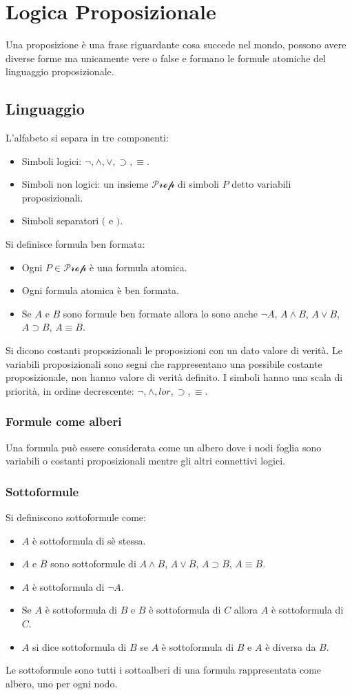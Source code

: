 \chapter{Logica Proposizionale}
Una proposizione \`e una frase riguardante cosa succede nel mondo, possono avere diverse forme ma unicamente vere o false e formano le formule atomiche del
linguaggio proposizionale. 
\section{Linguaggio}
L'alfabeto si separa in tre componenti:
\begin{itemize}
\item Simboli logici: $\neg, \land,\lor, \supset, \equiv$.
\item Simboli non logici: un insieme $\mathcal{Prop}$ di simboli $P$ detto variabili proposizionali.
\item Simboli separatori $($ e $)$.
\end{itemize}
Si definisce formula ben formata:
\begin{itemize}
\item Ogni $P\in\mathcal{Prop}$ \`e una formula atomica.
\item Ogni formula atomica \`e ben formata.
\item Se $A$ e $B$ sono formule ben formate allora lo sono anche $\neg A$, $A\land B$, $A\lor B$, $A\supset B$, $A\equiv B$.
\end{itemize}
Si dicono costanti proposizionali le proposizioni con un dato valore di verit\`a. Le variabili proposizionali sono segni che rappresentano una possibile 
costante proposizionale, non hanno valore di verit\`a definito. I simboli hanno una scala di priorit\`a, in ordine decrescente: $\neg, \land, lor, \supset, 
\equiv$. 
\subsection{Formule come alberi}
Una formula pu\`o essere considerata come un albero dove i nodi foglia sono variabili o costanti proposizionali mentre gli altri connettivi logici. 
\subsection{Sottoformule}
Si definiscono sottoformule come: 
\begin{itemize}
\item $A$ \`e sottoformula di s\`e stessa.
\item $A$ e $B$ sono sottoformule di $A\land B$, $A\lor B$, $A\supset B$, $A\equiv B$.
\item $A$ \`e sottoformula di $\neg A$. 
\item Se $A$ \`e sottoformula di $B$ e $B$ \`e sottoformula di $C$ allora $A$ \`e sottoformula di $C$.
\item $A$ si dice sottoformula di $B$ se $A$ \`e sottoformula di $B$ e $A$ \`e diversa da $B$.
\end{itemize}
Le sottoformule sono tutti i sottoalberi di una formula rappresentata come albero, uno per ogni nodo. 
